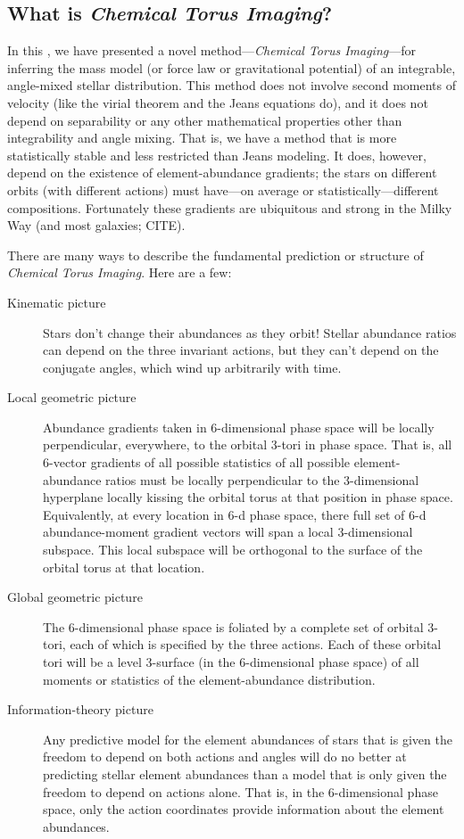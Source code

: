\documentclass[modern]{aastex63}
\newcommand{\methodname}{\textsl{Chemical Torus Imaging}}
\begin{document}
\subsection{What is \methodname?}

In this \documentname, we have presented a novel method---\methodname---for inferring
the mass model (or force law or gravitational potential) of an
integrable, angle-mixed stellar distribution.
This method does not involve second moments of velocity (like the
virial theorem and the Jeans equations do), and it does not depend on
separability or any other mathematical properties other than
integrability and angle mixing.
That is, we have a method that is more statistically stable and less
restricted than Jeans modeling.
It does, however, depend on the existence of element-abundance
gradients; the stars on different orbits (with different actions) must
have---on average or statistically---different compositions.
Fortunately these gradients are ubiquitous and strong in the Milky Way
(and most galaxies; CITE).

There are many ways to describe the fundamental prediction or structure
of \methodname. Here are a few:
\begin{description}
\item[Kinematic picture]
  Stars don't change their abundances as they orbit!  Stellar
  abundance ratios can depend on the three invariant actions, but they
  can't depend on the conjugate angles, which wind up arbitrarily with time.
\item[Local geometric picture]
  Abundance gradients taken in 6-dimensional phase space will be
  locally perpendicular, everywhere, to the orbital 3-tori in phase space.
  That is, all 6-vector gradients of all possible statistics of all possible
  element-abundance ratios must be locally perpendicular to the 3-dimensional
  hyperplane locally kissing the orbital torus at that position in phase space.
  Equivalently, at every location in 6-d phase space, there full set of 6-d
  abundance-moment gradient vectors will span a
  local 3-dimensional subspace.
  This local subspace will be orthogonal to the surface of the orbital torus
  at that location.
\item[Global geometric picture]
  The 6-dimensional phase space is foliated by a complete set of orbital 3-tori,
  each of which is specified by the three actions.
  Each of these orbital tori will be a level 3-surface
  (in the 6-dimensional phase space) of all
  moments or statistics of the element-abundance distribution.
\item[Information-theory picture]
  Any predictive model for the element abundances of stars
  that is given the freedom to depend on both actions and angles will do no
  better at predicting stellar element abundances than a model that is only
  given the freedom to depend on actions alone.
  That is, in the 6-dimensional phase space, only the action coordinates provide
  information about the element abundances.
\end{description}
\end{document}
